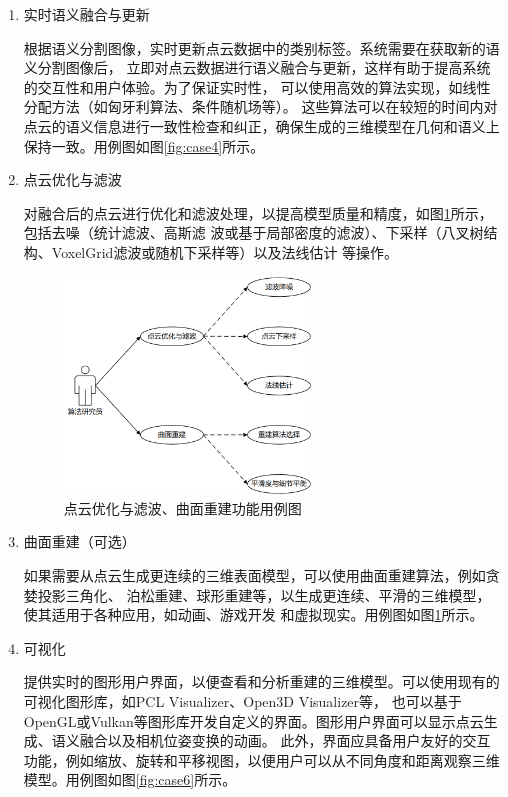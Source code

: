 \begin{enumerate}
	\item{实时语义融合与更新}
	\par 根据语义分割图像，实时更新点云数据中的类别标签。系统需要在获取新的语义分割图像后，
	立即对点云数据进行语义融合与更新，这样有助于提高系统的交互性和用户体验。为了保证实时性，
	可以使用高效的算法实现，如线性分配方法（如匈牙利算法\cite{hungarian}、条件随机场等）\cite{zeng20163dmatch,online_panoptic_3d,panopticfusion,voxblox}。
	这些算法可以在较短的时间内对点云的语义信息进行一致性检查和纠正，确保生成的三维模型在几何和语义上保持一致。用例图如图\ref{fig:case4}所示。

	\item{点云优化与滤波}
	\par 对融合后的点云进行优化和滤波处理，以提高模型质量和精度，如图\ref{fig:case5}所示，包括去噪（统计滤波、高斯滤
	波或基于局部密度的滤波）、下采样（八叉树结构、VoxelGrid滤波或随机下采样等）以及法线估计
	等操作。

	\begin{figure}[htb]
		\centering
		\includegraphics[width=0.618\textwidth]{figures/uml/case5.png}
		\caption{点云优化与滤波、曲面重建功能用例图}
		\label{fig:case5}
	\end{figure}

	\item{曲面重建（可选）}
	\par 如果需要从点云生成更连续的三维表面模型，可以使用曲面重建算法，例如贪婪投影三角化、
	泊松重建、球形重建等，以生成更连续、平滑的三维模型，使其适用于各种应用，如动画、游戏开发
	和虚拟现实。用例图如图\ref{fig:case5}所示。

	\item{可视化}
	\par 提供实时的图形用户界面，以便查看和分析重建的三维模型。可以使用现有的可视化图形库，如PCL Visualizer\cite{pcl}、Open3D Visualizer\cite{open3d}等，
	也可以基于OpenGL或Vulkan等图形库开发自定义的界面。图形用户界面可以显示点云生成、语义融合以及相机位姿变换的动画。
	此外，界面应具备用户友好的交互功能，例如缩放、旋转和平移视图，以便用户可以从不同角度和距离观察三维模型。用例图如图\ref{fig:case6}所示。


\end{enumerate}
